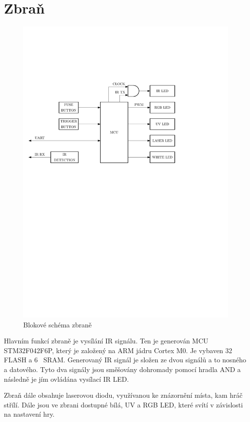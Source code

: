 \section{Zbraň}
\begin{figure}[H]
    \begin{center}
        \includegraphics[width=\textwidth]{img/gun}
    \end{center}
    \caption{Blokové schéma zbraně}
\end{figure}
Hlavním funkcí zbraně je vysílání IR signálu. Ten je generován MCU STM32F042F6P, který je založený na ARM jádru Cortex M0. Je vybaven 32~ FLASH a 6~ SRAM. Generovaný IR signál je složen ze dvou signálů a to nosného a datového. Tyto dva signály jsou směšovány dohromady pomocí hradla AND a následně je jím ovládána vysílací IR LED.

Zbraň dále obsahuje laserovou diodu, využívanou ke znázornění místa, kam hráč střílí. Dále jsou ve zbrani dostupné bílá, UV a RGB LED, které svítí v závislosti na nastavení hry.

